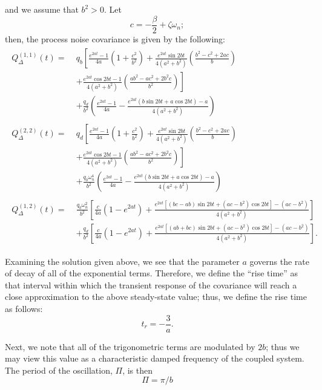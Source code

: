 and we assume that $b^2 > 0$.
Let $$c = -\frac{\beta}{2} + \zeta\omega_n;$$ then, the process noise covariance is given by the following:
\begin{align}\begin{split}
	Q_\Delta^{(1,1)}(t) =\; & q_b \left[ \frac{e^{2at}-1}{4a}
	\left( 1+\frac{c^2}{b^2} \right) + \frac{e^{2at}\sin2bt}{4(a^2+b^2)}
	\left( \frac{b^2-c^2+2ac}{b} \right) \right. \\
	&\left. + \frac{e^{2at}\cos2bt-1}{4(a^2+b^2)}
	\left( \frac{ab^2-ac^2+2b^2c}{b^2} \right) \right] \\
	& + \frac{q_d}{b^2} \left( \frac{e^{2at}-1}{4a} -
	\frac{e^{2at}(b\sin2bt + a\cos2bt) - a}{4(a^2+b^2)} \right)
\end{split} \\
\begin{split}
	Q_\Delta^{(2,2)}(t) =\; & q_d \left[ \frac{e^{2at}-1}{4a}
	\left( 1+\frac{c^2}{b^2} \right) + \frac{e^{2at}\sin2bt}{4(a^2+b^2)}
	\left( \frac{b^2-c^2+2ac}{b} \right) \right. \\
	&\left. + \frac{e^{2at}\cos2bt-1}{4(a^2+b^2)}
	\left( \frac{ab^2-ac^2+2b^2c}{b^2} \right) \right] \\
	& + \frac{q_b \omega_n^4}{b^2} \left( \frac{e^{2at}-1}{4a} -
	\frac{e^{2at}(b\sin2bt + a\cos2bt) - a}{4(a^2+b^2)} \right)
\end{split} \\
\begin{split}
	Q_\Delta^{(1,2)}(t) =\; & \frac{q_b \omega_n^2}{b^2} \left[ \frac{c}{4a}
	\left( 1 - e^{2at} \right)
	+ \frac{e^{2at} \left[ (bc-ab)\sin2bt + (ac-b^2)\cos2bt \right]
	-(ac-b^2)}{4(a^2+b^2)} \right] \\
	& + \frac{q_d}{b^2} \left[ \frac{c}{4a} \left( 1 - e^{2at} \right)
	+ \frac{e^{2at} \left[ (ab+bc)\sin2bt + (ac-b^2)\cos2bt \right]
	-(ac-b^2)}{4(a^2+b^2)} \right].
\end{split}\end{align}

Examining the solution given above, we see that the parameter $a$ governs the rate of decay of all of the exponential terms.  Therefore, we define the ``rise time'' as that interval within which the transient response of the covariance will reach a close approximation to the above steady-state value; thus, we define the rise time as follows:
\begin{equation}
	t_r = -\frac{3}{a}.
\end{equation}

Next, we note that all of the trigonometric terms are modulated by $2b$; thus we may view this value as a characteristic damped frequency of the coupled system.  The period of the oscillation, $\Pi$, is then
\begin{equation}
	\Pi = \pi/b
\end{equation}

